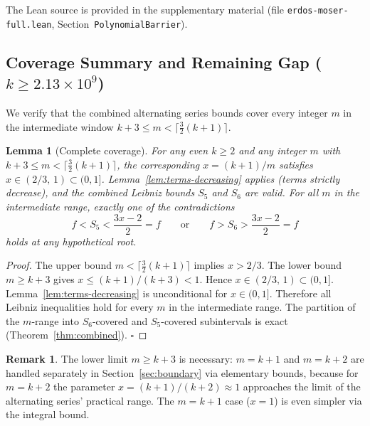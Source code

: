 \documentclass[12pt,a4paper]{article}
\theoremstyle{plain}
\newtheorem{lemma}[theorem]{Lemma}
\theoremstyle{definition}
\newtheorem{remark}[theorem]{Remark}
\begin{document}
The Lean source is provided in the supplementary material (file
\texttt{erdos-moser-full.lean}, Section~\texttt{PolynomialBarrier}).

\bigskip

\subsection{Coverage Summary and Remaining Gap ($k \ge 2.13\times10^9$)}
\label{sec:coverage}

We verify that the combined alternating series bounds cover every integer $m$
in the intermediate window
$k+3 \le m < \lceil\frac{3}{2}(k+1)\rceil$.

\begin{lemma}[Complete coverage]\label{lem:coverage}
  For any even $k \ge 2$ and any integer $m$ with
  $k+3 \le m < \lceil\frac{3}{2}(k+1)\rceil$, the corresponding
  $x = (k+1)/m$ satisfies $x \in (2/3,\, 1) \subset (0, 1]$.
  Lemma~\ref{lem:terms-decreasing} applies (terms strictly decrease),
  and the combined Leibniz bounds $S_5$ and $S_6$ are valid.
  For all $m$ in the intermediate range, exactly one of the
  contradictions
  \[
    f < S_5 < \frac{3x-2}{2} = f \qquad\text{or}\qquad
    f > S_6 > \frac{3x-2}{2} = f
  \]
  holds at any hypothetical root.
\end{lemma}

\begin{proof}
  The upper bound $m < \lceil\frac{3}{2}(k+1)\rceil$ implies
  $x > 2/3$.  The lower bound $m \ge k+3$ gives
  $x \le (k+1)/(k+3) < 1$.  Hence $x \in (2/3,\, 1) \subset (0, 1]$.
  Lemma~\ref{lem:terms-decreasing} is unconditional for $x \in (0, 1]$.
  Therefore all Leibniz inequalities hold for every $m$ in the
  intermediate range.  The partition of the $m$-range into $S_6$-covered
  and $S_5$-covered subintervals is exact (Theorem~\ref{thm:combined}).
  \hfill$\square$
\end{proof}

\begin{remark}
  The lower limit $m \ge k+3$ is necessary: $m = k+1$ and $m = k+2$ are
  handled separately in Section~\ref{sec:boundary} via elementary bounds,
  because for $m = k+2$ the parameter $x = (k+1)/(k+2) \approx 1$ approaches
  the limit of the alternating series' practical range.  The $m = k+1$ case
  ($x=1$) is even simpler via the integral bound.
\end{remark}
\end{document}
